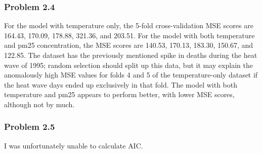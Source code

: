\documentclass[
  letterpaper,
  DIV=11,
  numbers=noendperiod]{scrartcl}
\begin{document}
\newpage

\subsubsection{Problem 2.4}\label{problem-2.4}

For the model with temperature only, the 5-fold cross-validation MSE
scores are 164.43, 170.09, 178.88, 321.36, and 203.51. For the model
with both temperature and pm25 concentration, the MSE scores are 140.53,
170.13, 183.30, 150.67, and 122.85. The dataset has the previously
mentioned spike in deaths during the heat wave of 1995; random selection
should split up this data, but it may explain the anomalously high MSE
values for folds 4 and 5 of the temperature-only dataset if the heat
wave days ended up exclusively in that fold. The model with both
temperature and pm25 appears to perform better, with lower MSE scores,
although not by much.

\subsubsection{Problem 2.5}\label{problem-2.5}

I was unfortunately unable to calculate AIC.
\end{document}
